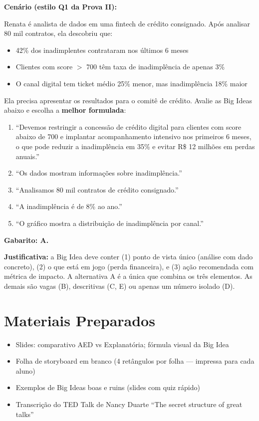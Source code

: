 \begin{SolvedBox}
\textbf{Cenário (estilo Q1 da Prova II):}

Renata é analista de dados em uma fintech de crédito consignado. Após
analisar 80 mil contratos, ela descobriu que:
\begin{itemize}
  \item 42\% dos inadimplentes contrataram nos últimos 6 meses
  \item Clientes com score $>$ 700 têm taxa de inadimplência de apenas 3\%
  \item O canal digital tem ticket médio 25\% menor, mas inadimplência 18\% maior
\end{itemize}

Ela precisa apresentar os resultados para o comitê de crédito. Avalie as
Big Ideas abaixo e escolha a \textbf{melhor formulada}:

\begin{enumerate}[label=\Alph*)]
  \item ``Devemos restringir a concessão de crédito digital para clientes
  com score abaixo de 700 e implantar acompanhamento intensivo nos primeiros
  6 meses, o que pode reduzir a inadimplência em 35\% e evitar R\$ 12 milhões
  em perdas anuais.''
  \item ``Os dados mostram informações sobre inadimplência.''
  \item ``Analisamos 80 mil contratos de crédito consignado.''
  \item ``A inadimplência é de 8\% ao ano.''
  \item ``O gráfico mostra a distribuição de inadimplência por canal.''
\end{enumerate}

\textbf{Gabarito: A.}

\textbf{Justificativa:} a Big Idea deve conter (1) ponto de vista único
(análise com dado concreto), (2) o que está em jogo (perda financeira),
e (3) ação recomendada com métrica de impacto. A alternativa A é a única
que combina os três elementos. As demais são vagas (B), descritivas (C, E)
ou apenas um número isolado (D).
\end{SolvedBox}

\section{Materiais Preparados}
\begin{itemize}
  \item Slides: comparativo AED vs Explanatória; fórmula visual da Big Idea
  \item Folha de storyboard em branco (4 retângulos por folha — impressa para cada aluno)
  \item Exemplos de Big Ideas boas e ruins (slides com quiz rápido)
  \item Transcrição do TED Talk de Nancy Duarte ``The secret structure of great talks''
\end{itemize}

